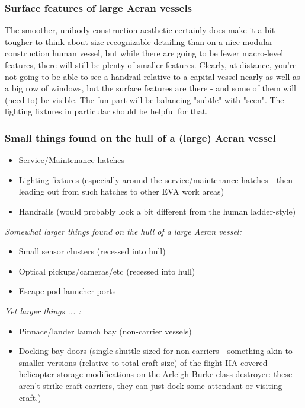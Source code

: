 \subsubsection{Surface features of large Aeran vessels}

The smoother, unibody construction aesthetic certainly does make it a
bit tougher to think about size-recognizable detailing than on a nice
modular-construction human vessel, but while there are going to be
fewer macro-level features, there will still be plenty of smaller
features. Clearly, at distance, you're not going to be able to see a
handrail relative to a capital vessel nearly as well as a big row of
windows, but the surface features are there - and some of them will
(need to) be visible. The fun part will be balancing "subtle" with
"seen". The lighting fixtures in particular should be helpful for
that.

\subsubsection{Small things found on the hull of a (large) Aeran vessel}
\begin{itemize}
\item Service/Maintenance hatches
\item Lighting fixtures (especially around the service/maintenance hatches -
then leading out from such hatches to other EVA work areas)
\item Handrails (would probably look a bit different from the human ladder-style)
\end{itemize}
{\it Somewhat larger things found on the hull of a large Aeran vessel:}
\begin{itemize}
\item Small sensor clusters (recessed into hull)
\item Optical pickups/cameras/etc (recessed into hull)
\item Escape pod launcher ports
\end{itemize}
{\it Yet larger things ... :}
\begin{itemize}
\item Pinnace/lander launch bay (non-carrier vessels)
\item Docking bay doors (single shuttle sized for non-carriers - something
akin to smaller versions (relative to total craft size) of the flight
IIA covered helicopter storage modifications on the Arleigh Burke
class destroyer: these aren't strike-craft carriers, they can just
dock some attendant or visiting craft.)
\end{itemize}

